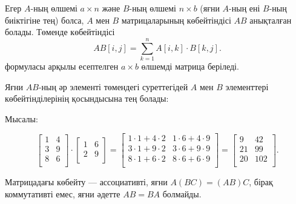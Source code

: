 
Егер $A$-ның өлшемі 
$a \times n$ және $B$-ның өлшемі 
$n \times b$ (яғни $A$-ның ені $B$-ның
биіктігіне тең) болса, $A$ мен $B$ матрицаларының көбейтіндісі 
$AB$ анықталған болады. Төменде көбейтіндісі 
\[
AB[i,j] = \sum_{k=1}^n A[i,k] \cdot B[k,j].
\]
формуласы арқылы есептелген $a \times b$ өлшемді
матрица беріледі. 

Яғни $AB$-ның әр элементі төмендегі суреттегідей
$A$ мен $B$ элементтері көбейтінділерінің қосындысына тең болады:

\begin{center}
\end{center}

Мысалы:

\[
 \begin{bmatrix}
  1 & 4 \\
  3 & 9 \\
  8 & 6 \\
 \end{bmatrix}
\cdot
 \begin{bmatrix}
  1 & 6 \\
  2 & 9 \\
 \end{bmatrix}
=
 \begin{bmatrix}
  1 \cdot 1 + 4 \cdot 2 & 1 \cdot 6 + 4 \cdot 9 \\
  3 \cdot 1 + 9 \cdot 2 & 3 \cdot 6 + 9 \cdot 9 \\
  8 \cdot 1 + 6 \cdot 2 & 8 \cdot 6 + 6 \cdot 9 \\
 \end{bmatrix}
=
 \begin{bmatrix}
  9 & 42 \\
  21 & 99 \\
  20 & 102 \\
 \end{bmatrix}.
\]

Матрицадағы көбейту –– ассоциативті,
яғни $A(BC)=(AB)C$, бірақ коммутативті 
емес, яғни әдетте $AB = BA$ болмайды.

